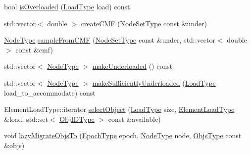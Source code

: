 \begin{DoxyCompactItemize}
\item 
bool \hyperlink{structvt_1_1vrt_1_1collection_1_1lb_1_1_tempered_l_b_ab737fad35804f7a6db9ae67a7a5fa982}{is\+Overloaded} (\hyperlink{structvt_1_1vrt_1_1collection_1_1lb_1_1_base_l_b_a215e22b9f12678303f49615ae3be05cc}{Load\+Type} load) const
\item 
std\+::vector$<$ double $>$ \hyperlink{structvt_1_1vrt_1_1collection_1_1lb_1_1_tempered_l_b_add46961d85ddad906cfd66aba09a0bd1}{create\+C\+MF} (\hyperlink{structvt_1_1vrt_1_1collection_1_1lb_1_1_tempered_l_b_aa18a0edaf10119e307e7209371caa673}{Node\+Set\+Type} const \&under)
\item 
\hyperlink{namespacevt_a866da9d0efc19c0a1ce79e9e492f47e2}{Node\+Type} \hyperlink{structvt_1_1vrt_1_1collection_1_1lb_1_1_tempered_l_b_a674736589bb2c1cadba7516e0bf598b9}{sample\+From\+C\+MF} (\hyperlink{structvt_1_1vrt_1_1collection_1_1lb_1_1_tempered_l_b_aa18a0edaf10119e307e7209371caa673}{Node\+Set\+Type} const \&under, std\+::vector$<$ double $>$ const \&cmf)
\item 
std\+::vector$<$ \hyperlink{namespacevt_a866da9d0efc19c0a1ce79e9e492f47e2}{Node\+Type} $>$ \hyperlink{structvt_1_1vrt_1_1collection_1_1lb_1_1_tempered_l_b_af3c49d726cab946d817f87ee94b417a2}{make\+Underloaded} () const
\item 
std\+::vector$<$ \hyperlink{namespacevt_a866da9d0efc19c0a1ce79e9e492f47e2}{Node\+Type} $>$ \hyperlink{structvt_1_1vrt_1_1collection_1_1lb_1_1_tempered_l_b_a946bd9c5a6591f8494ecd11be5092ef0}{make\+Sufficiently\+Underloaded} (\hyperlink{structvt_1_1vrt_1_1collection_1_1lb_1_1_base_l_b_a215e22b9f12678303f49615ae3be05cc}{Load\+Type} load\+\_\+to\+\_\+accommodate) const
\item 
Element\+Load\+Type\+::iterator \hyperlink{structvt_1_1vrt_1_1collection_1_1lb_1_1_tempered_l_b_a191c3b0d3f7a06de4510b1c3370eabc2}{select\+Object} (\hyperlink{structvt_1_1vrt_1_1collection_1_1lb_1_1_base_l_b_a215e22b9f12678303f49615ae3be05cc}{Load\+Type} size, \hyperlink{structvt_1_1vrt_1_1collection_1_1lb_1_1_base_l_b_aa286d31a0820a8fc9218ccb858368fca}{Element\+Load\+Type} \&load, std\+::set$<$ \hyperlink{structvt_1_1vrt_1_1collection_1_1lb_1_1_base_l_b_a790b22acf448880599724749cdc4e9b3}{Obj\+I\+D\+Type} $>$ const \&available)
\item 
void \hyperlink{structvt_1_1vrt_1_1collection_1_1lb_1_1_tempered_l_b_a00af3637cea1d345fea518d2608d5596}{lazy\+Migrate\+Objs\+To} (\hyperlink{namespacevt_a81d11b28122d43bf9834577e4a06440f}{Epoch\+Type} epoch, \hyperlink{namespacevt_a866da9d0efc19c0a1ce79e9e492f47e2}{Node\+Type} node, \hyperlink{structvt_1_1vrt_1_1collection_1_1lb_1_1_tempered_l_b_ad54faf59319f1b33dec689ee853d688e}{Objs\+Type} const \&objs)

\end{DoxyCompactItemize}
